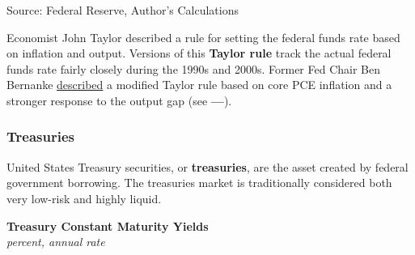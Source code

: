 \documentclass{report}
\newcommand{\tbllink}[1]{\href{https://raw.githubusercontent.com/bdecon/US-chartbook/master/chartbook/data/#1}{\faTable}}
\begin{document}
{\begin{minipage}{0.76\textwidth}
\footnotesize{Source: Federal Reserve, Author's Calculations} \hfill \tbllink{rates.csv}
\vspace{2mm}

\small Economist John Taylor described a rule for setting the federal funds rate based on inflation and output. Versions of this \textbf{Taylor rule} track the actual federal funds rate fairly closely during the 1990s and 2000s. Former Fed Chair Ben Bernanke \href{https://www.brookings.edu/blog/ben-bernanke/2015/04/28/the-taylor-rule-a-benchmark-for-monetary-policy/}{described} a modified Taylor rule based on core PCE inflation and a stronger response to the output gap (see {\color{cyan!80!white}\textbf{---}}). 
\end{minipage}
\newpage
\begin{minipage}{0.76\textwidth}
\subsubsection*{Treasuries}
\small United States Treasury securities, or \textbf{treasuries}, are the asset created by federal government borrowing. The treasuries market is traditionally considered both very low-risk and highly liquid. 

 
\end{minipage}
\vspace{1mm}

\begin{minipage}{0.98\textwidth}
\normalsize \textbf{Treasury Constant Maturity Yields}\\
\footnotesize{\textit{percent, annual rate}}
\vspace{3.8cm}


\end{minipage}}
\end{document}
